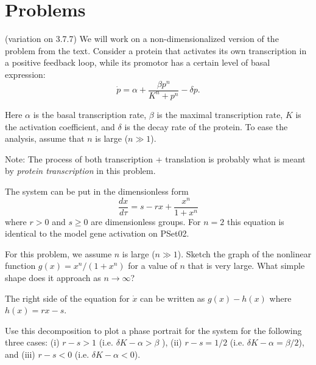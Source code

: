 \documentclass[12pt,letterpaper]{exam}
\begin{document}
\section*{Problems}


\begin{questions}
\question (variation on 3.7.7) We will work on a non-dimensionalized version of the problem from the text.  Consider a protein that activates its own transcription in a positive feedback loop, while its promotor has a certain level of basal expression:
\[\dot{p} = \alpha + \frac{\beta p^n}{K^n+p^n} - \delta p.\]

Here $\alpha$ is the basal transcription rate, $\beta$ is the maximal transcription rate, $K$ is the activation coefficient, and $\delta$ is the decay rate of the protein.  To ease the analysis, assume that $n$ is large ($n\gg 1$).

Note:  The process of both transcription + translation is probably what is meant by \emph{protein transcription} in this problem.

The system can be put in the dimensionless form \[\frac{dx}{d\tau} = s - r x + \frac{x^n}{1+x^n}\] where $r>0$ and $s\geq 0$ are dimensionless groups.  For $n=2$ this equation is identical to the model gene activation on PSet02.

\begin{parts}
\begin{solution}
\end{solution}
\item   For this problem, we assume $n$ is large ($n\gg 1$).  Sketch the graph of the nonlinear function $g(x) = x^n/(1+x^n)$ for a value of $n$ that is very large.  What simple shape does it approach as $n\rightarrow \infty$?
\begin{solution}
\end{solution}
\item The right side of the equation for $\dot{x}$ can be written as $g(x) - h(x)$ where $h(x) = rx - s$.  

Use this decomposition to plot a phase portrait for the system for the following three cases: (i) $r-s>1$ (i.e. $\delta K - \alpha >\beta$ ), (ii) $r-s = 1/2$ (i.e. $\delta K - \alpha = \beta/2$), and (iii) $r-s<0$ (i.e. $\delta K - \alpha < 0$).  


\end{parts}
\end{questions}
\end{document}
